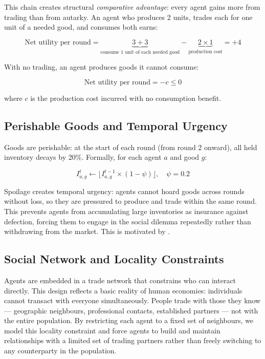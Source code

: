 \documentclass{article}
\begin{document}
This chain creates structural \textit{comparative advantage}: every agent gains more from trading than from autarky. An agent who produces 2 units, trades each for one unit of a needed good, and consumes both earns:

\[
\text{Net utility per round} = \underbrace{3 + 3}_{\text{consume 1 unit of each needed good}} - \underbrace{2 \times 1}_{\text{production cost}} = +4
\]

With no trading, an agent produces goods it cannot consume:

\[
\text{Net utility per round} = -c \leq 0
\]

where $c$ is the production cost incurred with no consumption benefit.

\subsection{Perishable Goods and Temporal Urgency}

Goods are perishable: at the start of each round (from round 2 onward), all held inventory decays by 20\%. Formally, for each agent $a$ and good $g$:

\[
I_{a,g}^{t} \leftarrow \lfloor I_{a,g}^{t-1} \times (1 - \psi) \rfloor, \quad \psi = 0.2
\]

Spoilage creates temporal urgency: agents cannot hoard goods across rounds without loss, so they are pressured to produce and trade within the same round. This prevents agents from accumulating large inventories as insurance against defection, forcing them to engage in the social dilemma repeatedly rather than withdrawing from the market. This is motivated by \citet{chen2018perishable}.

\subsection{Social Network and Locality Constraints}

Agents are embedded in a trade network that constrains who can interact directly. This design reflects a basic reality of human economies: individuals cannot transact with everyone simultaneously. People trade with those they know --- geographic neighbours, professional contacts, established partners --- not with the entire population. By restricting each agent to a fixed set of neighbours, we model this locality constraint and force agents to build and maintain relationships with a limited set of trading partners rather than freely switching to any counterparty in the population.
\end{document}
